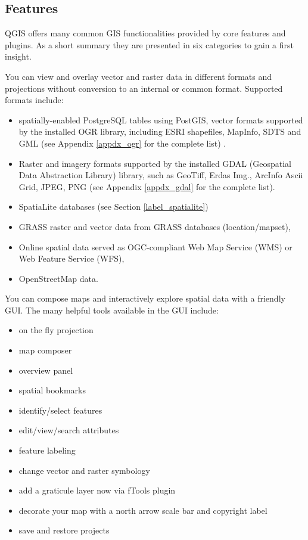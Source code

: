 \subsection{Features}\label{label_majfeat}

QGIS offers many common GIS functionalities provided by core features and
plugins. As a short summary they are presented in six categories to gain a
first insight.


You can view and overlay vector and raster data in different formats and
projections without conversion to an internal or common format. Supported
formats include:

\begin{itemize}
\item spatially-enabled PostgreSQL tables using PostGIS, vector 
formats
 supported by the installed OGR library, including ESRI shapefiles, MapInfo, 
SDTS and GML (see Appendix \ref{appdx_ogr} for the complete list) .
\item Raster and imagery formats supported by the installed GDAL (Geospatial
Data Abstraction Library) library, such as GeoTiff, Erdas Img., ArcInfo Ascii 
Grid, JPEG, PNG (see Appendix \ref{appdx_gdal} for the complete list).
\item SpatiaLite databases (see Section \ref{label_spatialite}) 
\item GRASS raster and vector data from GRASS databases (location/mapset), 
\item Online spatial data served as OGC-compliant Web Map Service (WMS) or
Web Feature Service (WFS),
\item OpenStreetMap data.
\end{itemize}


You can compose maps and interactively explore spatial data with a friendly
GUI. The many helpful tools available in the GUI include:

\begin{itemize}
\item on the fly projection
\item map composer
\item overview panel
\item spatial bookmarks
\item identify/select features
\item edit/view/search attributes
\item feature labeling
\item change vector and raster symbology
\item add a graticule layer now via fTools plugin
\item decorate your map with a north arrow scale bar and copyright label
\item save and restore projects
\end{itemize}

